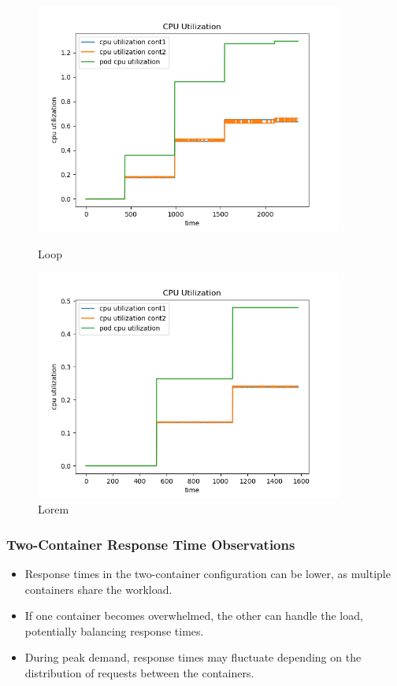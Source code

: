 \begin{figure}[h]
    \begin{minipage}[t]{0.5\textwidth}
        \centering
        \includegraphics[width=0.9\textwidth]{../sample_results/loop/two-container/cpu-utilization-two-container.png}
        \caption{Loop}
    \end{minipage}
    \hfill
    \begin{minipage}[t]{0.5\textwidth}
        \centering
        \includegraphics[width=0.9\textwidth]{../sample_results/lorem/two-container/cpu-utilization-two-container.png}
        \caption{Lorem}
    \end{minipage}
\end{figure}

\newpage
\subsubsection{Two-Container Response Time Observations}
\begin{itemize}
    \item Response times in the two-container configuration can be lower, as multiple containers share the workload.
    \item If one container becomes overwhelmed, the other can handle the load, potentially balancing response times.
    \item During peak demand, response times may fluctuate depending on the distribution of requests between the containers.
\end{itemize}

